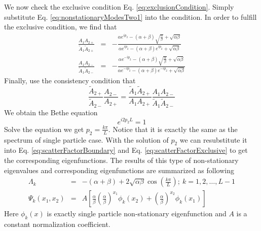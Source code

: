 We now check the exclusive condition Eq. \eqref{eq:exclusionCondition}. Simply
substitute Eq.  \eqref{eq:nonstationaryModesTwo1} into the condition. In order to
fulfill the exclusive condition, we find that 
\begin{subequations}
    \label{eq:scatterFactorExclusive}
    \begin{align}
        \frac{A_{1}A_{2+}}{\tilde{A}_{1}\tilde{A}_{2+}} & = & -\frac{\alpha
            e^{ip_2}-(\alpha+\beta) \sqrt{\frac{\alpha}{\beta}} +
            \sqrt{\alpha\beta} }{\alpha e^{ip_2} -(\alpha+\beta)e^{ip_2} +
            \sqrt{\alpha\beta} } \\
        \frac{A_{1}A_{2-}}{\tilde{A}_{1}\tilde{A}_{2-}} & = & -\frac{\alpha
            e^{-ip_2}-(\alpha+\beta) \sqrt{\frac{\alpha}{\beta}} +
            \sqrt{\alpha\beta} }{\alpha e^{-ip_2} -(\alpha+\beta)e^{-ip_2} +
            \sqrt{\alpha\beta} } 
    \end{align}
\end{subequations}
Finally, use the consistency condition that
\begin{equation}
    \label{eq:consistencyConditionTwo}
    \frac{\tilde{A}_{2+}}{\tilde{A}_{2-}}\frac{A_{2-}}{A_{2+}} = 
    \frac{\tilde{A}_{1}\tilde{A}_{2+}}{A_{1}A_{2+}}
    \frac{A_{1}A_{2-}}{\tilde{A}_{1}\tilde{A}_{2-}}
\end{equation}
We obtain the Bethe equation 
\begin{equation}
    \label{eq:betheEqTwo1}
    e^{i2p_2L} = 1
\end{equation}
Solve the equation we get $p_2=\frac{k\pi}{L}$. Notice that it is exactly the
same as the spectrum of single particle case. With the solution of $p_2$ we can
resubstitute it into Eq. \eqref{eq:scatterFactorBoundary} and Eq.
\eqref{eq:scatterFactorExclusive} to get the corresponding eigenfunctions. 
The results of this type of non-stationary eigenvalues and corresponding
eigenfunctions are summarized as following 
\begin{subequations}
    \label{eq:eigenTwo}
    \begin{align}
        \label{eq:eigenvaluesTwo}
        \Lambda_k & = &
        -(\alpha+\beta) + 2\sqrt{\alpha\beta}\cos(\frac{k\pi}{L});
        ~k=1,2,\dots, L-1  \\
        \label{eq:eigenvectorsTwo}
        \Psi_k(x_1, x_2) & = & A\left[ \frac{\alpha}{\beta}
            \left(\frac{\alpha}{\beta}
            \right)^{x_1}\phi_k(x_2)+\left(\frac{\alpha}{\beta}\right)^{x_2}
            \phi_k(x_1) \right]
    \end{align}
\end{subequations}
Here $\phi_k(x)$ is exactly single particle non-stationary eigenfunction and
$A$ is a constant normalization coefficient.

